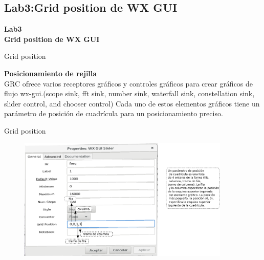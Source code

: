 \subsection{Lab3:Grid position de WX GUI}
\begin{frame}{}


\bfseries{\textrm{\LARGE Lab3\\ \LARGE Grid position de \newline WX GUI}}
\raggedright
\end{frame}

\begin{frame}{Grid position}


\textbf {Posicionamiento de rejilla} \\
\vspace{2mm}
GRC ofrece varios receptores gráficos y controles gráficos para crear gráficos de flujo wx-gui.(scope sink, fft sink, number sink, waterfall sink, constellation sink, slider control, and chooser control) Cada uno de estos elementos gráficos tiene un parámetro de posición de cuadrícula para un posicionamiento preciso.

\end{frame}

\begin{frame}{Grid position}

\begin{figure}[H]
\centering
\vspace{-3mm}
\includegraphics[width=0.9\textwidth]{parte1/lab3/pdf/lab0_1.pdf}


\end{figure}

\end{frame}

